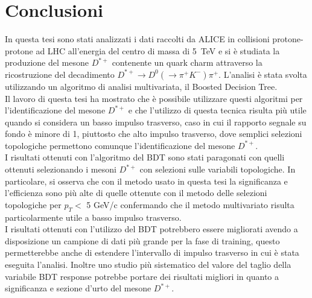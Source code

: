 \chapter{Conclusioni}

In questa tesi sono stati analizzati i dati raccolti da ALICE in collisioni protone-protone ad LHC all'energia del centro di massa di 5~TeV e si è studiata la produzione del mesone $D^{*+}$ contenente un quark charm attraverso la ricostruzione del decadimento $D^{*+} \rightarrow D^{0}(\rightarrow \pi^+ K^-)\pi^+$. L'analisi è stata svolta utilizzando un algoritmo di analisi multivariata, il Boosted Decision Tree.
\\Il lavoro di questa tesi ha mostrato che \`e possibile utilizzare questi algoritmi per l'identificazione del mesone $D^{*+}$ e che l'utilizzo di questa tecnica risulta pi\`u utile quando si considera un basso impulso trasverso, caso in cui il rapporto segnale su fondo \`e minore di 1, piuttosto che alto impulso trasverso, dove semplici selezioni topologiche permettono comunque l'identificazione del mesone $D^{*+}$.
\\I risultati ottenuti con l'algoritmo del BDT sono stati paragonati con quelli ottenuti selezionando i mesoni $D^{*+}$ con selezioni sulle variabili topologiche. In particolare, si osserva che con il metodo usato in questa tesi la significanza e l'efficienza sono pi\`u alte di quelle ottenute con il metodo delle selezioni topologiche per $p_T <$ 5 GeV/c confermando che il metodo multivariato risulta particolarmente utile a basso impulso trasverso.
\\I risultati ottenuti con l'utilizzo del BDT potrebbero essere migliorati avendo a disposizione un campione di dati pi\`u grande per la fase di training, questo permetterebbe anche di estendere l'intervallo di impulso trasverso in cui \`e stata eseguita l'analisi. Inoltre uno studio più sistematico del valore del taglio della variabile BDT response potrebbe portare dei risultati migliori in quanto a significanza e sezione d'urto del mesone $D^{*+}$.